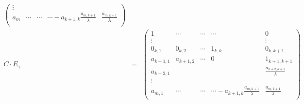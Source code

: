 \documentclass{report}
\begin{document}
{{{\begin{align*}
\begin{pmatrix}
					                                                                                         \vdots       &            &        &                                                &                               \\
					                                                                                         a_{m}        & \cdots     & \cdots & \cdots  - a_{k+1, k}\frac{a_{m, k+1}}{\lambda} & \frac{a_{m, k+1}}{\lambda}    \\\end{pmatrix}                                        \\
				C \cdot E_{\gamma} & =                                                                                                       & \begin{pmatrix}
					                                                                                                                               1            & \cdots     & \cdots & \cdots                                         & 0                              \\
					                                                                                                                               \vdots       &            &        &                                                & \vdots                         \\
					                                                                                                                               0_{k, 1}     & 0_{k, 2}   & \cdots & 1_{k, k}                                       & 0_{k, k+1}                     \\
					                                                                                                                               a_{k+1, 1}   & a_{k+1, 2} & \cdots & 0                                              & 1_{k+1,k+1}                    \\
					                                                                                                                               a_{k + 2, 1} &            &        &                                                & \frac{a_{k + 2, k+1}}{\lambda} \\
					                                                                                                                               \vdots       &            &        &                                                &                                \\
					                                                                                                                               a_{m, 1}     & \cdots     & \cdots & \cdots  - a_{k+1, k}\frac{a_{m, k+1}}{\lambda} & \frac{a_{m, k+1}}{\lambda}     \\\end{pmatrix}
			\end{align*}

}}}
\end{document}
